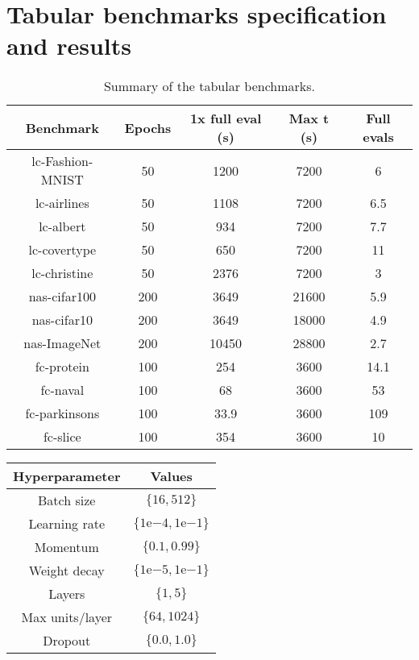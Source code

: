 \chapter{Tabular benchmarks specification and results}

\begin{table}[H]
    \centering
\begin{tabular}{ccccc}
    \hline
    \textbf{Benchmark} & \textbf{Epochs} & \textbf{1x full eval (s)} & \textbf{Max t (s)} & \textbf{Full evals} \\ \hline
    lc-Fashion-MNIST & 50 & 1200 & 7200 & 6 \\ \hline
    lc-airlines & 50  & 1108 & 7200  & 6.5 \\ \hline
    lc-albert  & 50  & 934  & 7200 & 7.7 \\ \hline
    lc-covertype  & 50  & 650  & 7200  & 11  \\ \hline
    lc-christine  & 50  & 2376  & 7200  & 3  \\ \hline
    nas-cifar100 & 200 & 3649  & 21600  & 5.9 \\ \hline
    nas-cifar10  & 200 & 3649  & 18000 & 4.9 \\ \hline
    nas-ImageNet & 200 & 10450 & 28800 & 2.7 \\ \hline
    fc-protein & 100 & 254  & 3600  & 14.1 \\ \hline
    fc-naval  & 100  & 68  & 3600  & 53 \\ \hline
    fc-parkinsons  & 100  & 33.9 & 3600  & 109 \\ \hline
    fc-slice  & 100  & 354 & 3600  & 10 \\ \hline
\end{tabular}
\caption{Summary of the tabular benchmarks.}
\end{table}


\begin{table}
    \centering
\begin{tabular}{cc}
    \textbf{Hyperparameter} & \textbf{Values} \\ \midrule
    Batch size & $\{16, 512\}$ \\
    Learning rate & $\{1\mathrm{e}{-4}, 1\mathrm{e}{-1}\}$ \\
    Momentum & $\{0.1, 0.99\}$ \\
    Weight decay & $\{1\mathrm{e}{-5}, 1\mathrm{e}{-1}\}$ \\
    Layers & $\{1, 5\}$ \\
    Max units/layer & $\{64, 1024\}$ \\
    Dropout & $\{0.0, 1.0\}$
    \end{tabular}
\end{table}

